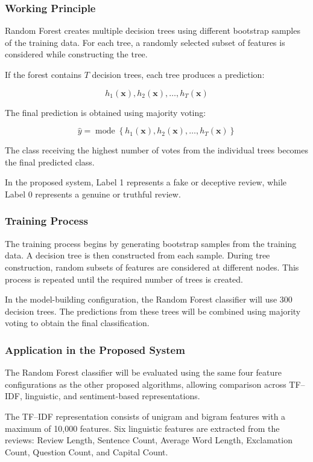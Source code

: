 \documentclass[12pt,a4paper]{report}
\begin{document}
\subsubsection*{Working Principle}

Random Forest creates multiple decision trees using different bootstrap samples of the training data. For each tree, a randomly selected subset of features is considered while constructing the tree.

If the forest contains \(T\) decision trees, each tree produces a prediction:

\[
h_1(\mathbf{x}),h_2(\mathbf{x}),\ldots,h_T(\mathbf{x})
\]

The final prediction is obtained using majority voting:

\[
\hat{y}
=
\operatorname{mode}
\left\{
h_1(\mathbf{x}),
h_2(\mathbf{x}),
\ldots,
h_T(\mathbf{x})
\right\}
\]

The class receiving the highest number of votes from the individual trees becomes the final predicted class.

In the proposed system, Label 1 represents a fake or deceptive review, while Label 0 represents a genuine or truthful review.

\subsubsection*{Training Process}

The training process begins by generating bootstrap samples from the training data. A decision tree is then constructed from each sample. During tree construction, random subsets of features are considered at different nodes. This process is repeated until the required number of trees is created.

In the model-building configuration, the Random Forest classifier will use 300 decision trees. The predictions from these trees will be combined using majority voting to obtain the final classification.

\subsubsection*{Application in the Proposed System}

The Random Forest classifier will be evaluated using the same four feature configurations as the other proposed algorithms, allowing comparison across TF--IDF, linguistic, and sentiment-based representations.

The TF--IDF representation consists of unigram and bigram features with a maximum of 10,000 features. Six linguistic features are extracted from the reviews: Review Length, Sentence Count, Average Word Length, Exclamation Count, Question Count, and Capital Count.
\end{document}
